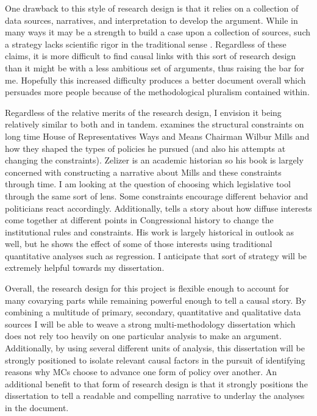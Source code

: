 \documentclass[12pt]{article}
\begin{document}
One drawback to this style of research design is that it relies on a collection of data sources, narratives, and interpretation to develop the argument. While in many ways it may be a strength to build a case upon a collection of sources, such a strategy lacks scientific rigor in the traditional sense \citep{king1994}. Regardless of these claims, it is more difficult to find causal links with this sort of research design than it might be with a less ambitious set of arguments, thus raising the bar for me. Hopefully this increased difficulty produces a better document overall which persuades more people because of the methodological pluralism contained within.

Regardless of the relative merits of the research design, I envision it being relatively similar to both \cite{zelizer1998} and \cite{schickler2001} in tandem. \cite{zelizer1998} examines the structural constraints on long time House of Representatives Ways and Means Chairman Wilbur Mills and how they shaped the types of policies he pursued (and also his attempts at changing the constraints). Zelizer is an academic historian so his book is largely concerned with constructing a narrative about Mills and these constraints through time. I am looking at the question of choosing which legislative tool through the same sort of lens. Some constraints encourage different behavior and politicians react accordingly. Additionally, \cite{schickler2001} tells a story about how diffuse interests come together at different points in Congressional history to change the institutional rules and constraints. His work is largely historical in outlook as well, but he shows the effect of some of those interests using traditional quantitative analyses such as regression. I anticipate that sort of strategy will be extremely helpful towards my dissertation.

Overall, the research design for this project is flexible enough to account for many covarying parts while remaining powerful enough to tell a causal story. By combining a multitude of primary, secondary, quantitative and qualitative data sources I will be able to weave a strong multi-methodology dissertation which does not rely too heavily on one particular analysis to make an argument. Additionally, by using several different units of analysis, this dissertation will be strongly positioned to isolate relevant causal factors in the pursuit of identifying reasons why MCs choose to advance one form of policy over another. An additional benefit to that form of research design is that it strongly positions the dissertation to tell a readable and compelling narrative to underlay the analyses in the document. 
\end{document}

